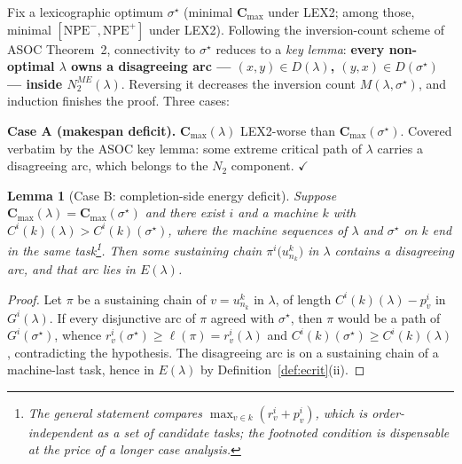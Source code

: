 \documentclass[11pt,a4paper]{article}
\newtheorem{lemma}{Lemma}
\newcommand{\NPE}{\mathrm{NPE}}
\begin{document}
Fix a lexicographic optimum $\sigma^{\star}$ (minimal
$\mathbf{C}_{\max}$ under LEX2; among those, minimal
$[\NPE^-,\NPE^+]$ under LEX2). Following the inversion-count scheme of
ASOC Theorem~2, connectivity to $\sigma^{\star}$ reduces to a
\emph{key lemma}: \textbf{every non-optimal $\lambda$ owns a disagreeing
arc — $(x,y)\in D(\lambda)$, $(y,x)\in D(\sigma^{\star})$ — inside
$N_2^{ME}(\lambda)$}. Reversing it decreases the inversion count
$M(\lambda,\sigma^{\star})$, and induction finishes the proof. Three cases:

\medskip\noindent\textbf{Case A (makespan deficit).}
$\mathbf{C}_{\max}(\lambda)$ LEX2-worse than
$\mathbf{C}_{\max}(\sigma^{\star})$. Covered verbatim by the ASOC key
lemma: some extreme critical path of $\lambda$ carries a disagreeing arc,
which belongs to the $N_2$ component. \hfill$\checkmark$

\begin{lemma}[Case B: completion-side energy deficit]\label{lem:C}
Suppose $\mathbf{C}_{\max}(\lambda)=\mathbf{C}_{\max}(\sigma^{\star})$ and
there exist $i$ and a machine $k$ with $C^i(k)(\lambda)>C^i(k)(\sigma^{\star})$,
where the machine sequences of $\lambda$ and $\sigma^\star$ on $k$ end in
the same task\footnote{The general statement compares
$\max_{v\in k}(r^i_v+p^i_v)$, which is order-independent as a set of
candidate tasks; the footnoted condition is dispensable at the price of a
longer case analysis.}. Then some sustaining chain
$\pi^i\bigl(u^k_{n_k}\bigr)$ in $\lambda$ contains a disagreeing arc, and
that arc lies in $E(\lambda)$.
\end{lemma}

\begin{proof}
Let $\pi$ be a sustaining chain of $v=u^k_{n_k}$ in $\lambda$, of length
$C^i(k)(\lambda)-p^i_v$ in $G^i(\lambda)$. If every disjunctive arc of
$\pi$ agreed with $\sigma^{\star}$, then $\pi$ would be a path of
$G^i(\sigma^{\star})$, whence
$r^i_v(\sigma^{\star})\ge \ell(\pi)=r^i_v(\lambda)$ and
$C^i(k)(\sigma^{\star})\ge C^i(k)(\lambda)$, contradicting the hypothesis.
The disagreeing arc is on a sustaining chain of a machine-last task, hence
in $E(\lambda)$ by Definition~\ref{def:ecrit}(ii).
\end{proof}
\end{document}
